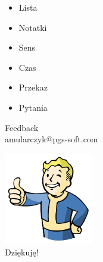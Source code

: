 \documentclass{beamer}
\begin{document}
\begin{frame}{}
	\begin{Large}
		\begin{itemize}
			\item Lista
			\item Notatki
			\item Sens
			\item Czas
			\item Przekaz
			\item Pytania
		\end{itemize}
	\end{Large}
\end{frame}


\begin{frame}{}
	\begin{center}
		\Huge{Feedback}\\
		\Large{amularczyk@pgs-soft.com}
	\end{center}
\end{frame}

\begin{frame}{}
	\begin{center}
  		\includegraphics[height=4cm]{ok.png} \\
		\Huge{Dziękuję!}
	\end{center}
\end{frame}
\end{document}
